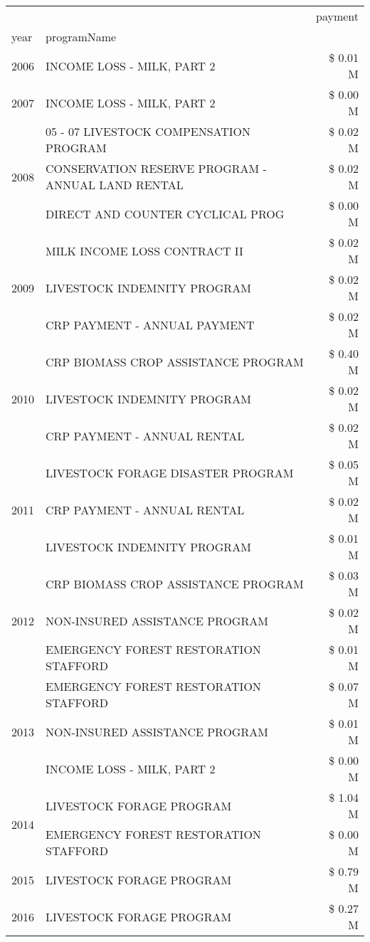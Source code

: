 \begin{tabular}{llr}
\toprule
 &  & payment \\
year & programName &  \\
\midrule
2006 & INCOME LOSS - MILK, PART 2 & \$ 0.01 M \\
\cline{1-3}
2007 & INCOME LOSS - MILK, PART 2 & \$ 0.00 M \\
\cline{1-3}
\multirow[t]{3}{*}{2008} & 05 - 07 LIVESTOCK COMPENSATION PROGRAM & \$ 0.02 M \\
 & CONSERVATION RESERVE PROGRAM - ANNUAL LAND RENTAL & \$ 0.02 M \\
 & DIRECT AND COUNTER CYCLICAL PROG & \$ 0.00 M \\
\cline{1-3}
\multirow[t]{3}{*}{2009} & MILK INCOME LOSS CONTRACT II & \$ 0.02 M \\
 & LIVESTOCK INDEMNITY PROGRAM & \$ 0.02 M \\
 & CRP PAYMENT - ANNUAL PAYMENT & \$ 0.02 M \\
\cline{1-3}
\multirow[t]{3}{*}{2010} & CRP BIOMASS CROP ASSISTANCE PROGRAM & \$ 0.40 M \\
 & LIVESTOCK INDEMNITY PROGRAM & \$ 0.02 M \\
 & CRP PAYMENT - ANNUAL RENTAL & \$ 0.02 M \\
\cline{1-3}
\multirow[t]{3}{*}{2011} & LIVESTOCK FORAGE DISASTER PROGRAM & \$ 0.05 M \\
 & CRP PAYMENT - ANNUAL RENTAL & \$ 0.02 M \\
 & LIVESTOCK INDEMNITY PROGRAM & \$ 0.01 M \\
\cline{1-3}
\multirow[t]{3}{*}{2012} & CRP BIOMASS CROP ASSISTANCE PROGRAM & \$ 0.03 M \\
 & NON-INSURED ASSISTANCE PROGRAM & \$ 0.02 M \\
 & EMERGENCY FOREST RESTORATION STAFFORD & \$ 0.01 M \\
\cline{1-3}
\multirow[t]{3}{*}{2013} & EMERGENCY FOREST RESTORATION STAFFORD & \$ 0.07 M \\
 & NON-INSURED ASSISTANCE PROGRAM & \$ 0.01 M \\
 & INCOME LOSS - MILK, PART 2 & \$ 0.00 M \\
\cline{1-3}
\multirow[t]{2}{*}{2014} & LIVESTOCK FORAGE PROGRAM & \$ 1.04 M \\
 & EMERGENCY FOREST RESTORATION STAFFORD & \$ 0.00 M \\
\cline{1-3}
2015 & LIVESTOCK FORAGE PROGRAM & \$ 0.79 M \\
\cline{1-3}
\multirow[t]{2}{*}{2016} & LIVESTOCK FORAGE PROGRAM & \$ 0.27 M \\

\end{tabular}
